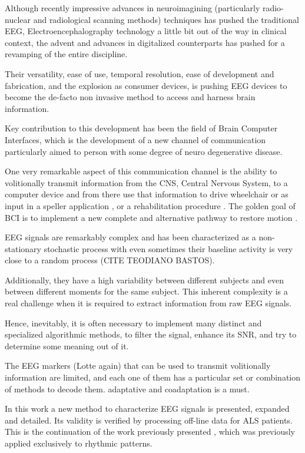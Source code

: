 \documentclass[entropy,article,submit,moreauthors,pdftex,10pt,a4paper]{mdpi}
\begin{document}
Although recently impressive advances in neuroimagining (particularly radio-nuclear and radiological scanning methods) \citep{Schomer2010} techniques has pushed the traditional EEG, Electroencephalography technology a little bit out of the way in clinical context, the advent and advances in digitalized counterparts has pushed for a revamping of the entire discipline.

Their versatility, ease of use, temporal resolution, ease of development and fabrication, and the explosion as consumer devices, is pushing EEG devices to become the de-facto non invasive method to access and harness brain information.

Key contribution to this development has been the field of Brain Computer Interfaces, which is the development of a new channel of communication particularly aimed to person with some degree of neuro degenerative disease.

One very remarkable aspect of this communication channel is the ability to volitionally transmit information from the CNS, Central Nervous System, to a computer device and from there use that information to drive wheelchair or as input in a speller application \citep{Guger2009a}, or a rehabilitation procedure \citep{Jure2016}.  The golden goal of BCI is to implement a new complete and alternative pathway to restore motion \citep{WolpawJonathanR2012}.

EEG signals are remarkably complex and has been characterized as a non-stationary stochastic process with even sometimes their baseline activity is very close to a random process (CITE TEODIANO BASTOS).

Additionally, they have a high variability between different subjects and even between different moments for the same subject.  This inherent complexity is a real challenge when it is required to extract information from raw EEG signals.

Hence, inevitably, it is often necessary to implement many distinct and specialized algorithmic methods, to filter the signal, enhance its SNR, and try to determine some meaning out of it.  

The EEG markers (Lotte again) that can be used to transmit volitionally information are limited, and each one of them has a particular set or combination of methods to decode them. adaptative and coadaptation is a must.

In this work a new method to characterize EEG signals is presented, expanded and detailed.  Its validity is verified by processing off-line data for ALS patients.  This is the continuation of the work previously presented \citep{Ramele2016}, which was previously applied exclusively to rhythmic patterns.
\end{document}
